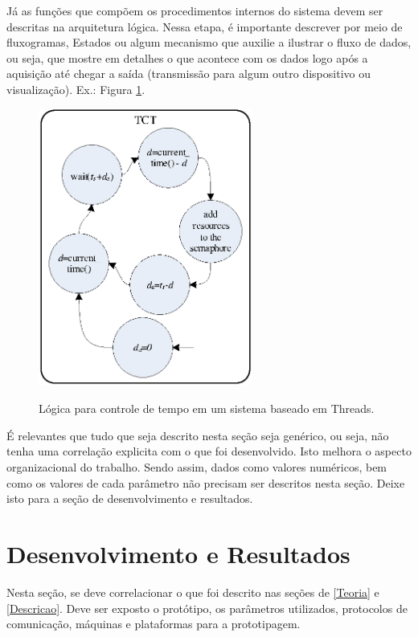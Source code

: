 \documentclass[
	12pt,				%
	openright,			%
	oneside,			%
	a4paper,			%
	brazil,				%
	]{abntex2}
\begin{document}
Já as funções que compõem os procedimentos internos do sistema devem ser descritas na arquitetura lógica. Nessa etapa, é importante descrever por meio de fluxogramas, Estados ou algum mecanismo que auxilie a ilustrar o fluxo de dados, ou seja, que mostre em detalhes o que acontece com os dados logo após a aquisição até chegar a saída (transmissão para algum outro dispositivo ou visualização).  Ex.: Figura \ref{fig:ATCT}.

\begin{figure}[ht]
\begin{center}
  \includegraphics[width=7cm,height=9.13cm]{Imagens/Figura6.eps}\\
  \caption{Lógica para controle de tempo em um sistema baseado em Threads.}\label{fig:ATCT}
\end{center}
\end{figure}

É relevantes que tudo que seja descrito nesta seção seja genérico, ou seja, não tenha uma correlação explicita com o que foi desenvolvido. Isto melhora o aspecto organizacional do trabalho. Sendo assim, dados como valores numéricos, bem como os valores de cada parâmetro não precisam ser descritos nesta seção. Deixe isto para a seção de desenvolvimento e resultados.

\chapter{Desenvolvimento e Resultados}
   Nesta seção, se deve correlacionar o que foi descrito nas seções de \ref{Teoria} e \ref{Descricao}. Deve ser exposto o protótipo, os parâmetros utilizados, protocolos de comunicação, máquinas e plataformas para a prototipagem.
   
\end{document}
